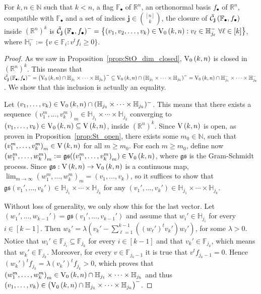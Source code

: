 \begin{lemma}\label{lem:closure_of_cells} For $k,n\in\mathbb{N}$ such that $k<n$, a flag $\mathbb{F}_{\bullet}$ of $\mathbb{R}^n$, an orthonormal basis $f_{\bullet}$ of $\mathbb{R}^n$, compatible with $\mathbb{F}_{\bullet}$ and a set of indices $\mathbf{j}\in\binom{[n]}{k}$, the closure of $\tilde{\mathcal{C}}_{\mathbf{j}}\left(\mathbb{F}_{\bullet},f_{\bullet}\right)$ inside ${\left(\mathbb{R}^n\right)}^k$ is $\stcell{j}^-=\left\{(v_1,v_2,\ldots,v_k)\in\StO{k}{n}:v_{\ell}\in\mathbb{H}_{j_{\ell}}^-\ \forall\ell\in[k]\right\}$, where $\mathbb{H}_i^-:=\{v\in\mathbb{F}_i:v^tf_i\geq 0\}$.
\end{lemma}
\begin{proof} As we saw in Proposition~\ref{prop:StO_dim_closed}, $\StO{k}{n}$ is closed in ${\left(\mathbb{R}^n\right)}^k$. This means that $\stcell{j}^-={\big(\StO{k}{n}\cap\mathbb{H}_{j_1}\times\cdots\times\mathbb{H}_{j_k}\big)}^-\subseteq\StO{k}{n}\cap{(\mathbb{H}_{j_1}\times\cdots\times\mathbb{H}_{j_k})}^-=\StO{k}{n}\cap\mathbb{H}_{j_1}^-\times\cdots\times\mathbb{H}_{j_k}^-$. We show that this inclusion is actually an equality.

Let $(v_1,\ldots,v_k)\in\StO{k}{n}\cap(\mathbb{H}_{j_1}\times\cdots\times\mathbb{H}_{j_k})^-$. This means that there exists a sequence ${(v_1^m,\ldots,v_k^m)}_m\in\mathbb{H}_{j_1}\times\cdots\times\mathbb{H}_{j_k}$ converging to $(v_1,\ldots,v_k)\in\StO{k}{n}\subseteq\St{k}{n}$, inside ${\left(\mathbb{R}^n\right)}^k$. Since $\St{k}{n}$ is open, as proven in Proposition~\ref{prop:St_open}, there exists some $m_0\in\mathbb{N}$, such that ${(v_1^m,\ldots,v_k^m)}_m\in\St{k}{n}$ for all $m\geq m_0$. For each $m\geq m_0$, define now ${(w_1^m,\ldots,w_k^m)}_m:=\mathfrak{gs}({(v_1^m,\ldots,v_k^m)}_m)\in\StO{k}{n}$, where $\mathfrak{gs}$ is the Gram-Schmidt process. Since $\mathfrak{gs}:\St{k}{n}\to\StO{k}{n}$ is a continuous map, $\lim_{m\to\infty}(w_1^m,\ldots,w_k^m)_m=(v_1,\ldots,v_k)$, so it suffices to show that $\mathfrak{gs}(v_1',\ldots,v_k')\in\mathbb{H}_{j_1}\times\cdots\times\mathbb{H}_{j_k}$ for any $(v_1',\ldots,v_k')\in\mathbb{H}_{j_1}\times\cdots\times\mathbb{H}_{j_k}$.

Without loss of generality, we only show this for the last vector. Let $(w_1',\ldots,w_{k-1}')=\mathfrak{gs}(v_1',\ldots,v_{k-1}')$ and assume that $w_i'\in\mathbb{H}_{j_i}$ for every $i\in[k-1]$. Then $w_k'=\lambda\left(v_k'-\sum_{\ell=1}^{k-1}((w_{\ell}')^tv_k')w_{\ell}'\right)$, for some $\lambda>0$. Notice that $w_i'\in\mathbb{F}_{j_i}\subseteq\mathbb{F}_{j_k}$ for every $i\in[k-1]$ and that $v_k'\in\mathbb{F}_{j_k}$, which means that $w_k'\in\mathbb{F}_{j_k}$. Moreover, for every $v\in\mathbb{F}_{j_k-1}$ it is true that $v^tf_{j_k-1}=0$. Hence $(w_k')^tf_{j_k}=\lambda(v_k')^tf_{j_k}>0$, which proves that ${(w_1^m,\ldots,w_k^m)}_m\in\StO{k}{n}\cap\mathbb{H}_{j_1}\times\cdots\times\mathbb{H}_{j_k}$ and thus
$(v_1,\ldots,v_k)\in{\big(\StO{k}{n}\cap\mathbb{H}_{j_1}\times\cdots\times\mathbb{H}_{j_k}\big)}^-$.
\end{proof}

